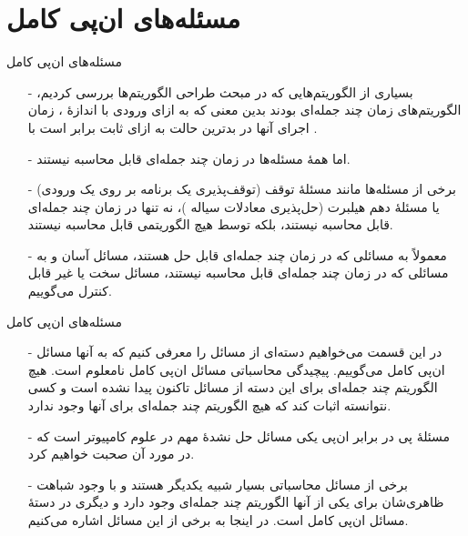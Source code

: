 \section{مسئله‌های ان‌پی کامل}

\begin{frame}{مسئله‌های ان‌پی کامل}
\begin{itemize}\itmsep{2mm}
\item[-]
بسیاری از الگوریتم‌هایی که در مبحث طراحی الگوریتم‌ها بررسی کردیم، الگوریتم‌های زمان
چند جمله‌ای بودند بدین معنی که به ازای ورودی با اندازهٔ
، زمان اجرای آنها در بدترین حالت به ازای ثابت
برابر است با
 .
\item[-]
اما همهٔ مسئله‌ها در زمان چند جمله‌ای قابل محاسبه نیستند.
\item[-]
برخی از مسئله‌ها مانند مسئلهٔ توقف
(توقف‌پذیری یک برنامه بر روی یک ورودی)
یا مسئلهٔ دهم هیلبرت (حل‌پذیری معادلات سیاله
)،
 نه تنها در زمان چند جمله‌ای قابل محاسبه نیستند، بلکه توسط هیچ الگوریتمی قابل محاسبه نیستند.
\item[-]
معمولاً به مسائلی که در زمان چند جمله‌ای قابل حل هستند، مسائل آسان و به مسائلی که در زمان چند جمله‌ای قابل محاسبه نیستند، مسائل سخت
یا غیر قابل کنترل
می‌گوییم.
\end{itemize}
\end{frame}


\begin{frame}{مسئله‌های ان‌پی کامل}
\begin{itemize}\itemr
\item[-]
در این قسمت می‌خواهیم دسته‌ای از مسائل را معرفی کنیم که به آنها مسائل ان‌پی کامل
می‌گوییم.
پیچیدگی محاسباتی مسائل ان‌پی کامل نامعلوم است. هیچ الگوریتم چند جمله‌ای برای این دسته از مسائل تاکنون پیدا نشده است و کسی نتوانسته اثبات کند که هیچ الگوریتم چند جمله‌ای برای آنها وجود ندارد.
\item[-]
مسئلهٔ پی در برابر ان‌پی
یکی مسائل حل نشدهٔ مهم در علوم کامپیوتر است که در مورد آن صحبت خواهیم کرد.
\item[-]
برخی از مسائل محاسباتی بسیار شبیه یکدیگر هستند و با وجود شباهت ظاهری‌شان برای یکی از آنها الگوریتم چند جمله‌ای وجود دارد و دیگری در دستهٔ مسائل ان‌پی کامل است.
در اینجا به برخی از این مسائل اشاره می‌کنیم.
\end{itemize}
\end{frame}


